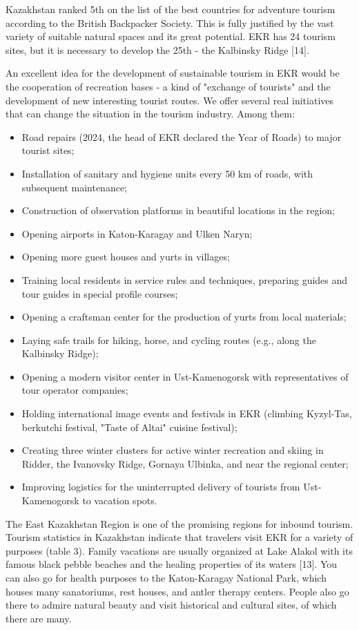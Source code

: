 \begin{multicols}{2}
Kazakhstan ranked 5th on the list of the best countries for adventure
tourism according to the British Backpacker Society. This is fully
justified by the vast variety of suitable natural spaces and its great
potential. EKR has 24 tourism sites, but it is necessary to develop the
25th - the Kalbinsky Ridge {[}14{]}.

An excellent idea for the development of sustainable tourism in EKR
would be the cooperation of recreation bases - a kind of "exchange of
tourists" and the development of new interesting tourist routes. We
offer several real initiatives that can change the situation in the
tourism industry. Among them:

\begin{itemize}
\item
  Road repairs (2024, the head of EKR declared the Year of Roads) to
  major tourist sites;
\item
  Installation of sanitary and hygiene units every 50 km of roads, with
  subsequent maintenance;
\item
  Construction of observation platforms in beautiful locations in the
  region;
\item
  Opening airports in Katon-Karagay and Ulken Naryn;
\item
  Opening more guest houses and yurts in villages;
\item
  Training local residents in service rules and techniques, preparing
  guides and tour guides in special profile courses;
\item
  Opening a craftsman center for the production of yurts from local
  materials;
\item
  Laying safe trails for hiking, horse, and cycling routes (e.g., along
  the Kalbinsky Ridge);
\item
  Opening a modern visitor center in Ust-Kamenogorsk with
  representatives of tour operator companies;
\item
  Holding international image events and festivals in EKR (climbing
  Kyzyl-Tas, berkutchi festival, "Taste of Altai" cuisine festival);
\item
  Creating three winter clusters for active winter recreation and skiing
  in Ridder, the Ivanovsky Ridge, Gornaya Ulbinka, and near the regional
  center;
\item
  Improving logistics for the uninterrupted delivery of tourists from
  Ust-Kamenogorsk to vacation spots.
\end{itemize}

The East Kazakhstan Region is one of the promising regions for inbound
tourism. Tourism statistics in Kazakhstan indicate that travelers visit
EKR for a variety of purposes (table 3). Family vacations are usually
organized at Lake Alakol with its famous black pebble beaches and the
healing properties of its waters {[}13{]}. You can also go for health
purposes to the Katon-Karagay National Park, which houses many
sanatoriums, rest houses, and antler therapy centers. People also go
there to admire natural beauty and visit historical and cultural sites,
of which there are many.
\end{multicols}


